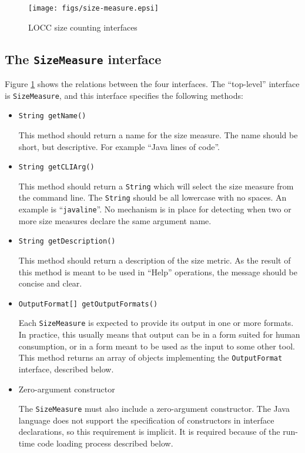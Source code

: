 \begin{figure}
\centering
\texttt{[image: figs/size-measure.epsi]}
\caption{LOCC size counting interfaces}
\label{fig:metric-interfaces}
\end{figure}

\subsection{The {\tt SizeMeasure} interface}

Figure \ref{fig:metric-interfaces} shows the relations between the four interfaces.  The
``top-level'' interface is \mbox{\tt SizeMeasure}, and this interface specifies
the following methods:

\begin{itemize}

\item \mbox{\tt String getName()}

This method should return a name for the size measure.  The name
should be short, but descriptive.  For example ``Java lines of code''.

\item \mbox{\tt String getCLIArg()}

This method should return a \mbox{\tt String} which will select the size measure
from the command line.  The \mbox{\tt String} should be all lowercase with no
spaces.  An example is \mbox{``{\tt javaline}''}.  No mechanism is in place for
detecting when two or more size measures declare the same argument
name.

\item \mbox{\tt String getDescription()}

This method should return a description of the size metric.  As the
result of this method is meant to be used in ``Help'' operations, the
message should be concise and clear.

\item \mbox{\tt OutputFormat[] getOutputFormats()}

Each \mbox{\tt SizeMeasure} is expected to provide its output in one or more
formats.  In practice, this usually means that output can be in a form 
suited for human consumption, or in a form meant to be used as the
input to some other tool\cite{Moore}.  This method returns an array of
objects implementing the \mbox{\tt OutputFormat} interface, described below.

\item Zero-argument constructor   

The \mbox{\tt SizeMeasure} must also include a zero-argument constructor.   The
Java language does not support the specification of constructors in
interface declarations, so this requirement is implicit.  It is
required because of the run-time code loading process described below.

\end{itemize}

